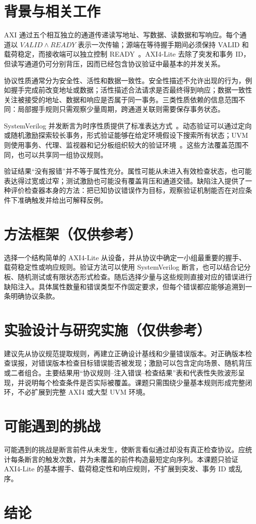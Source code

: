 \documentclass[sigconf,nonacm]{acmart}
\begin{document}
\section{背景与相关工作}
AXI 通过五个相互独立的通道传递读写地址、写数据、读数据和写响应。每个通道以 $VALID\land READY$ 表示一次传输；源端在等待握手期间必须保持 VALID 和载荷稳定，而接收端可以独立控制 READY~\cite{arm2020axi}。AXI4-Lite 去除了突发和事务 ID，但读写通道仍可分别背压，因而已经包含协议验证中最基本的并发关系。

协议性质通常分为安全性、活性和数据一致性。安全性描述不允许出现的行为，例如握手完成前改变地址或数据；活性描述合法请求是否最终得到响应；数据一致性关注被接受的地址、数据和响应是否属于同一事务。三类性质依赖的信息范围不同：局部握手规则只需观察少量周期，跨通道关联则需要保存事务状态。

SystemVerilog 并发断言为时序性质提供了标准表达方式~\cite{ieee2017sv,foster2009abv}。动态验证可以通过定向或随机激励探索较长事务，形式验证能够在给定环境假设下搜索所有状态；UVM 则使用事务、代理、监视器和记分板组织较大的验证环境~\cite{ieee2020uvm,bergeron2006testbenches}。这些方法覆盖范围不同，也可以共享同一组协议规则。

验证结果“没有报错”并不等于属性充分。属性可能从未进入有效检查状态，也可能表达得过宽或过窄；测试激励也可能没有覆盖背压和通道交错。缺陷注入提供了一种评价检查器本身的方法：把已知协议错误作为目标，观察验证机制能否在对应条件下准确触发并给出可解释反例。

\section{方法框架（仅供参考）}
选择一个结构简单的 AXI4-Lite 从设备，并从协议中确定一小组最重要的握手、载荷稳定性或响应规则。验证方法可以使用 SystemVerilog 断言，也可以结合记分板、随机测试或有限状态形式检查。随后选择少量与这些规则直接对应的错误进行缺陷注入。具体属性数量和错误类型不作固定要求，但每个错误都应能够追溯到一条明确协议条款。

\section{实验设计与研究实施（仅供参考）}
建议先从协议规范提取规则，再建立正确设计基线和少量错误版本。对正确版本检查误报，对错误版本检查目标错误能否被发现；激励可以包含定向场景、随机背压或二者组合。主要结果用“协议规则--注入错误--检查结果”表和代表性失败波形呈现，并说明每个检查条件是否实际被覆盖。课题只需围绕少量基本规则形成完整闭环，不必扩展到完整 AXI4 或大型 UVM 环境。

\section{可能遇到的挑战}
可能遇到的挑战是断言前件从未发生，使断言看似通过却没有真正检查协议。应统计每条断言的触发次数，并为未覆盖的前件构造最短定向序列。本课题只验证 AXI4-Lite 的基本握手、载荷稳定性和响应规则，不扩展到突发、事务 ID 或乱序。

\section{结论}



\end{document}
